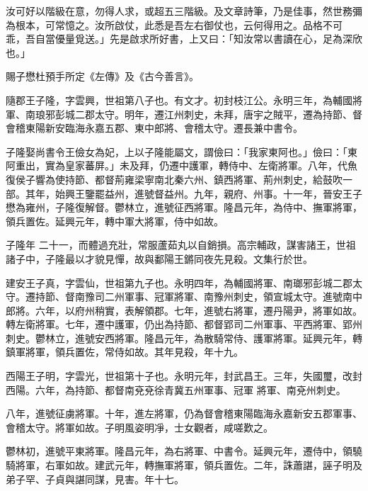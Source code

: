 \begin{pinyinscope}
 汝可好以階級在意，勿得人求，或超五三階級。及文章詩筆，乃是佳事，然世務彌為根本，可常憶之。汝所啟仗，此悉是吾左右御仗也，云何得用之。品格不可
 乖，吾自當優量覓送。」先是啟求所好書，上又曰：「知汝常以書讀在心，足為深欣也。」



 賜子懋杜預手所定《左傳》及《古今善言》。



 隨郡王子隆，字雲興，世祖第八子也。有文才。初封枝江公。永明三年，為輔國將軍、南琅邪彭城二郡太守。明年，遷江州刺史，未拜，唐宇之賊平，遷為持節、督會稽東陽新安臨海永嘉五郡、東中郎將、會稽太守。遷長兼中書令。



 子隆娶尚書令王儉女為妃，上以子隆能屬文，謂儉曰：「我家東阿也。」儉曰：「東阿重出，實為皇家蕃屏。」未及拜，仍遷中護軍，轉侍中、左衛將軍。八年，代魚復侯子響為使持節、都督荊雍梁寧南北秦六州、鎮西將軍、荊州刺史，給鼓吹一部。其年，始興王鑒罷益州，進號督益州。九年，親府、州事。十一年，晉安王子懋為雍州，子隆復解督。鬱林立，進號征西將軍。隆昌元年，為侍中、撫軍將軍，領兵置佐。延興元年，轉中軍大將軍，侍中如故。



 子隆年
 二十一，而體過充壯，常服蘆茹丸以自銷損。高宗輔政，謀害諸王，世祖諸子中，子隆最以才貌見憚，故與鄱陽王鏘同夜先見殺。文集行於世。



 建安王子真，字雲仙，世祖第九子也。永明四年，為輔國將軍、南瑯邪彭城二郡太守。遷持節、督南豫司二州軍事、冠軍將軍、南豫州刺史，領宣城太守。進號南中郎將。六年，以府州稍實，表解領郡。七年，進號右將軍，遷丹陽尹，將軍如故。轉左衛將軍。七年，遷中護軍，仍出為持節、都督郢司二州軍事、平西將軍、郢州刺史。鬱林立，進號安西將軍。隆昌元年，為散騎常侍、護軍將軍。延興元年，轉鎮軍將軍，領兵置佐，常侍如故。其年見殺，年十九。



 西陽王子明，字雲光，世祖第十子也。永明元年，封武昌王。三年，失國璽，改封西陽。六年，為持節、都督南兗兗徐青冀五州軍事、冠軍
 將軍、南兗州刺史。



 八年，進號征虜將軍。十年，進左將軍，仍為督會稽東陽臨海永嘉新安五郡軍事、會稽太守。將軍如故。子明風姿明凈，士女觀者，咸嗟歎之。



 鬱林初，進號平東將軍。隆昌元年，為右將軍、中書令。延興元年，遷侍中，領驍騎將軍，右軍如故。建武元年，轉撫軍將軍，領兵置佐。二年，誅蕭諶，誣子明及弟子罕、子貞與諶同謀，見害。年十七。




\end{pinyinscope}
